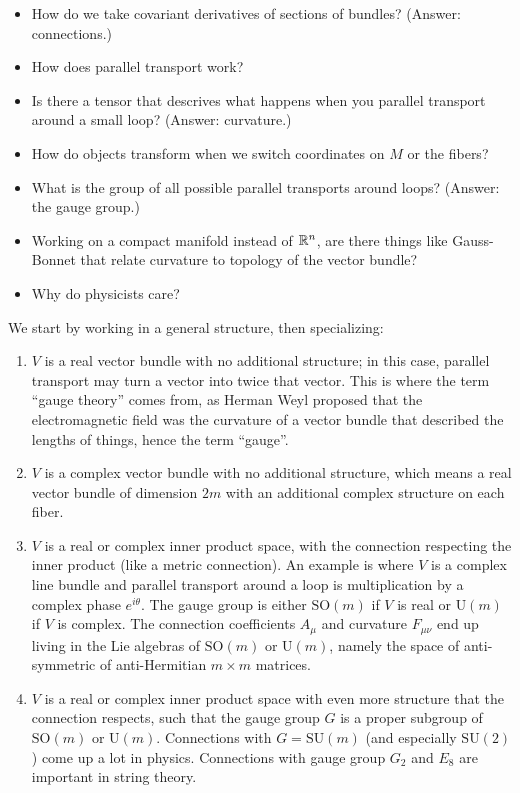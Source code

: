 \begin{itemize}
\setlength\itemsep{-.2em}
    \item How do we take covariant derivatives of sections of bundles? (Answer: connections.)
    \item How does parallel transport work?
    \item Is there a tensor that descrives what happens when you parallel transport around a small loop? (Answer: curvature.)
    \item How do objects transform when we switch coordinates on $M$ or the fibers?
    \item What is the group of all possible parallel transports around loops? (Answer: the gauge group.)
    \item Working on a compact manifold instead of $\mathbb{R}^n $, are there things like Gauss-Bonnet that relate curvature to topology of the vector bundle?
    \item Why do physicists care?
\end{itemize}

We start by working in a general structure, then specializing:

\begin{enumerate}[label=(\arabic*)]
\setlength\itemsep{-.2em}
    \item $V$ is a real vector bundle with no additional structure; in this case, parallel transport may turn a vector into twice that vector. This is where the term ``gauge theory'' comes from, as Herman Weyl proposed that the electromagnetic field was the curvature of a vector bundle that described the lengths of things, hence the term ``gauge''.
    \item $V$ is a complex vector bundle with no additional structure, which means a real vector bundle of dimension $2m$ with an additional complex structure on each fiber.
    \item $V$ is a real or complex inner product space, with the connection respecting the inner product (like a metric connection). An example is where $V$ is a complex line bundle and parallel transport around a loop is multiplication by a complex phase $e^{i \theta}$. The gauge group is either $\mathrm{SO}(m)$ if $V$ is real or $\mathrm{U}(m)$ if $V$ is complex. The connection coefficients $A_{\mu}$ and curvature $F_{\mu\nu}$ end up living in the Lie algebras of $\mathrm{SO}(m)$ or $\mathrm{U}(m)$, namely the space of anti-symmetric of anti-Hermitian $m \times m$ matrices.
    \item $V$ is a real or complex inner product space with even more structure that the connection respects, such that the gauge group $G$ is a proper subgroup of $\mathrm{SO}(m)$ or $\mathrm{U}(m)$. Connections with $G=\mathrm{SU}(m)$ (and especially $\mathrm{SU}(2)$) come up a lot in physics. Connections with gauge group $G_2$ and $E_8$ are important in string theory.
\end{enumerate}

